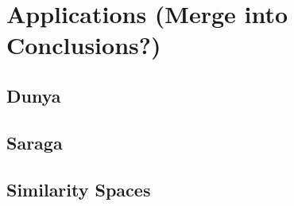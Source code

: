 
\chapter{Applications (Merge into Conclusions?\textsl{})}

\section{Dunya}
\section{Saraga}
\section {Similarity Spaces}



